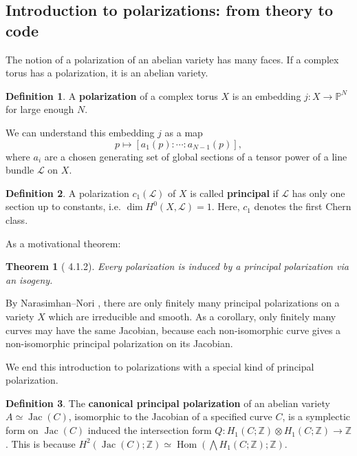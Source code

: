\documentclass[12pt,reqno]{amsart}
\DeclareMathOperator{\Hom}{Hom}
\DeclareMathOperator{\Jac}{Jac}
\newcommand{\mc}{\mathcal}
\renewcommand{\P}{\mathbb{P}}
\newtheorem*{thm*}{Theorem}
\theoremstyle{definition}
\newtheorem{defn}{Definition}
\theoremstyle{remark}
\begin{document}
\subsection{Introduction to polarizations: from theory to code}
\label{sec:intropol}
The notion of a polarization of an abelian variety has many faces. If a complex torus has a polarization, it is an abelian variety.

\begin{defn} A \textbf{polarization} of a complex torus $X$ is an embedding $j: X \to \P^N$ for large enough $N$. \end{defn}


We can understand this embedding $j$ as a map $$p \mapsto [a_1(p) : \cdots : a_{N-1}(p)],$$ where $a_i$ are a chosen generating set of global sections of a tensor power of a line bundle $\mc{L}$ on $X$.

\begin{defn}  A polarization $c_1(\mc{L})$ of $X$ is called \textbf{principal} if $\mc{L}$ has only one section up to constants, i.e. $\dim H^0(X, \mc{L}) = 1$. Here, $c_1$ denotes the first Chern class. \end{defn} 

As a motivational theorem:

\begin{thm*} [\cite{bl} 4.1.2] Every polarization is induced by a principal polarization via an isogeny. \end{thm*}

By Narasimhan--Nori \cite{nn}, there are only finitely many principal polarizations on a variety $X$ which are irreducible and smooth. As a corollary, only finitely many curves may have the same Jacobian, because each non-isomorphic curve gives a non-isomorphic principal polarization on its Jacobian.

\vspace{+5pt}
\noindent We end this introduction to polarizations with a special kind of principal polarization. 

\begin{defn} \label{canpp} The \textbf{canonical principal polarization} of an abelian variety $A \simeq \Jac(C)$, isomorphic to the Jacobian of a specified curve $C$, is a symplectic form on $\Jac(C)$ induced the intersection form $Q: H_1(C; \mathbb{Z}) \otimes H_1(C; \mathbb{Z}) \to\mathbb{Z}$. This is because $H^2(\Jac(C); \mathbb{Z}) \simeq \Hom(\bigwedge H_1(C; \mathbb{Z}); \mathbb{Z})$. \end{defn}
\end{document}
